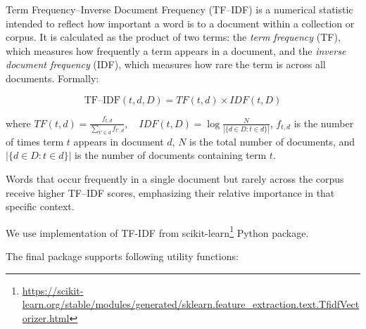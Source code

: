 Term Frequency–Inverse Document Frequency (TF–IDF) is a numerical statistic intended to reflect how important a word is to a document within a collection or corpus. It is calculated as the product of two terms: the \textit{term frequency} (TF), which measures how frequently a term appears in a document, and the \textit{inverse document frequency} (IDF), which measures how rare the term is across all documents. Formally:

\[
\text{TF–IDF}(t, d, D) = TF(t, d) \times IDF(t, D)
\]

\noindent where \(
TF(t, d) = \frac{f_{t,d}}{\sum_{t' \in d} f_{t',d}}, \quad
IDF(t, D) = \log\frac{N}{|\{d \in D : t \in d\}|}
\), \( f_{t,d} \) is the number of times term \( t \) appears in document \( d \), \( N \) is the total number of documents, and \( |\{d \in D : t \in d\}| \) is the number of documents containing term \( t \).

Words that occur frequently in a single document but rarely across the corpus receive higher TF–IDF scores, emphasizing their relative importance in that specific context.

\newpage
We use implementation of TF-IDF from scikit-learn\footnote{\url{https://scikit-learn.org/stable/modules/generated/sklearn.feature_extraction.text.TfidfVectorizer.html}} Python package.

The final package supports following utility functions:


